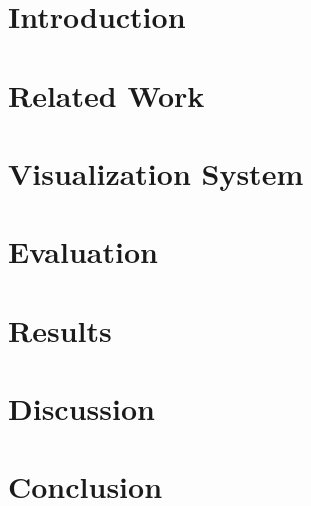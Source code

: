 \documentclass[conference]{IEEEtran}
\begin{document}
\section{Introduction}


\section{Related Work}

\section{Visualization System}

\section{Evaluation}

\section{Results}

\section{Discussion}

\section{Conclusion}
\end{document}
